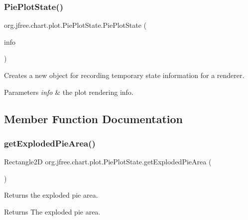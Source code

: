 \subsubsection{\texorpdfstring{Pie\+Plot\+State()}{PiePlotState()}}
{\footnotesize\ttfamily org.\+jfree.\+chart.\+plot.\+Pie\+Plot\+State.\+Pie\+Plot\+State (\begin{DoxyParamCaption}\item[{\mbox{\hyperlink{classorg_1_1jfree_1_1chart_1_1plot_1_1_plot_rendering_info}{Plot\+Rendering\+Info}}}]{info }\end{DoxyParamCaption})}

Creates a new object for recording temporary state information for a renderer.


\begin{DoxyParams}{Parameters}
{\em info} & the plot rendering info. \\
\hline
\end{DoxyParams}


\subsection{Member Function Documentation}
\mbox{\label{classorg_1_1jfree_1_1chart_1_1plot_1_1_pie_plot_state_a755d8f671b62c6db7414e87c7308b457}} 
\subsubsection{\texorpdfstring{get\+Exploded\+Pie\+Area()}{getExplodedPieArea()}}
{\footnotesize\ttfamily Rectangle2D org.\+jfree.\+chart.\+plot.\+Pie\+Plot\+State.\+get\+Exploded\+Pie\+Area (\begin{DoxyParamCaption}{ }\end{DoxyParamCaption})}

Returns the exploded pie area.

\begin{DoxyReturn}{Returns}
The exploded pie area. 
\end{DoxyReturn}
\mbox{\label{classorg_1_1jfree_1_1chart_1_1plot_1_1_pie_plot_state_aa10b2c59eadd60272431f307bc9a8649}} 
